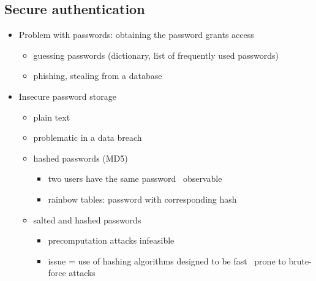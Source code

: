 \documentclass[12pt,titlepage,a4paper]{report}
\begin{document}
			\subsection{Secure authentication}
			\begin{itemize}
				\item Problem with passwords: obtaining the password grants access
				\begin{itemize}
					\item guessing passwords (dictionary, list of frequently used passwords)
					\item phishing, stealing from a database
				\end{itemize}
				\item Insecure password storage
				\begin{itemize}
					\item plain text
					\item problematic in a data breach
					\item hashed passwords (MD5)
					\begin{itemize}
						\item two users have the same password \textrightarrow \, observable
						\item rainbow tables: password with corresponding hash
					\end{itemize}
					\item salted and hashed passwords
					\begin{itemize}
						\item precomputation attacks infeasible
						\item issue = use of hashing algorithms
							\subitem designed to be fast \textrightarrow \, prone to brute-force attacks
					\end{itemize}
				\end{itemize}
				

\end{itemize}
\end{document}
